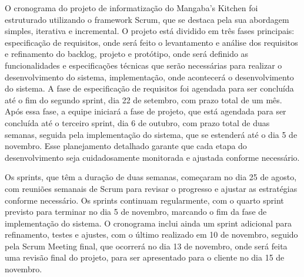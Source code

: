 \hspace{4.5mm}
O cronograma do projeto de informatização do Mangaba's Kitchen foi estruturado utilizando o framework Scrum, que se destaca pela sua abordagem simples, iterativa e incremental. O projeto está dividido em três fases principais: especificação de requisitos, onde será feito o levantamento e análise dos requisitos e refinamento do backlog, projeto e protótipo, onde será definido as funcionalidades e especificações técnicas que serão necessárias para realizar o desenvolvimento do sistema, implementação, onde acontecerá o desenvolvimento do sistema. A fase de especificação de requisitos foi agendada para ser concluída até o fim do segundo sprint, dia 22 de setembro, com prazo total de um mês. Após essa fase, a equipe iniciará a fase de projeto, que está agendada para ser concluída até o terceiro sprint, dia 6 de outubro, com prazo total de duas semanas, seguida pela implementação do sistema, que se estenderá até o dia 5 de novembro. Esse planejamento detalhado garante que cada etapa do desenvolvimento seja cuidadosamente monitorada e ajustada conforme necessário.
\par
Os sprints, que têm a duração de duas semanas, começaram no dia 25 de agosto, com reuniões semanais de Scrum para revisar o progresso e ajustar as estratégias conforme necessário. Os sprints continuam regularmente, com o quarto sprint previsto para terminar no dia 5 de novembro, marcando o fim da fase de implementação do sistema. O cronograma inclui ainda um sprint adicional para refinamento, testes e ajustes, com o último realizado em 10 de novembro, seguido pela Scrum Meeting final, que ocorrerá no dia 13 de novembro, onde será feita uma revisão final do projeto, para ser apresentado para o cliente no dia 15 de novembro.